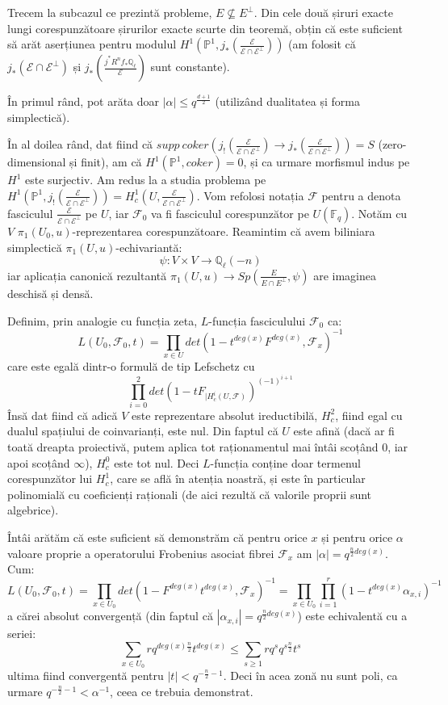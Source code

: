 \documentclass[13pt,openany]{book}
\begin{document}
Trecem la subcazul ce prezintă probleme, $E \nsubseteq E^\perp$. Din cele două șiruri exacte lungi corespunzătoare șirurilor exacte scurte din teoremă, obțin că este suficient să arăt aserțiunea pentru modulul $H^1(\mathbb{P}^1,j_*(\frac{\mathcal{E}}{\mathcal{E} \cap \mathcal{E}^\perp}))$ (am folosit că $j_*(\mathcal{E} \cap \mathcal{E}^\perp)$ și $j_*(\frac{j^* R^n f_* \mathbb{Q}_\ell}{\mathcal{E}})$ sunt constante).

În primul rând, pot arăta doar $|\alpha|\leq q^{\frac{d+1}{2}}$ (utilizând dualitatea și forma simplectică).

În al doilea rând, dat fiind că $supp\ coker(j_!(\frac{\mathcal{E}}{\mathcal{E} \cap \mathcal{E}^\perp}) \rightarrow j_*(\frac{\mathcal{E}}{\mathcal{E} \cap \mathcal{E}^\perp})) = S$ (zero-dimensional și finit), am că $H^1(\mathbb{P}^1,coker)=0$, și ca urmare morfismul indus pe $H^1$ este surjectiv. Am redus la a studia problema pe $H^1(\mathbb{P}^1,j_!(\frac{\mathcal{E}}{\mathcal{E} \cap \mathcal{E}^\perp})) = H^1_c (U, \frac{\mathcal{E}}{\mathcal{E} \cap \mathcal{E}^\perp})$. Vom refolosi notația $\mathcal{F}$ pentru a denota fasciculul $\frac{\mathcal{E}}{\mathcal{E} \cap \mathcal{E}^\perp}$ pe $U$, iar $\mathcal{F}_0$ va fi fasciculul corespunzător pe $U(\mathbb{F}_q)$. Notăm cu $V$ $\pi_1(U_0,u)$-reprezentarea corespunzătoare. Reamintim că avem biliniara simplectică $\pi_1(U,u)$-echivariantă:
$$\psi : V \times V \rightarrow \mathbb{Q}_\ell(-n)$$
iar aplicația canonică rezultantă $\pi_1(U,u) \rightarrow Sp(\frac{E}{E \cap E^\perp},\psi)$ are imaginea deschisă și densă.

Definim, prin analogie cu funcția zeta, $L$-funcția fasciculului $\mathcal{F}_0$ ca:
$$L(U_0,\mathcal{F}_0,t)=\prod\limits_{x \in U} det(1-t^{deg(x)}F^{deg(x)}, \mathcal{F}_x)^{-1}$$
care este egală dintr-o formulă de tip Lefschetz cu
$$\prod\limits_{i=0}^2 det(1-tF_{\mid H^i_c(U,\mathcal{F})})^{(-1)^{i+1}}$$
Însă dat fiind că adică $V$ este reprezentare absolut ireductibilă, $H^2_c$, fiind egal cu dualul spațiului de coinvarianți, este nul. Din faptul că $U$ este afină (dacă ar fi toată dreapta proiectivă, putem aplica tot raționamentul mai întâi scoțând $0$, iar apoi scoțând $\infty$), $H^0_c$ este tot nul. Deci $L$-funcția conține doar termenul corespunzător lui $H^1_c$, care se află în atenția noastră, și este în particular polinomială cu coeficienți raționali (de aici rezultă că valorile proprii sunt algebrice).

Întâi arătăm că este suficient să demonstrăm că pentru orice $x$ și pentru orice $\alpha$ valoare proprie a operatorului Frobenius asociat fibrei $\mathcal{F}_x$ am $|\alpha|=q^{\frac{n}{2} deg(x)}$. Cum:
$$L(U_0,\mathcal{F_0},t)=\prod\limits_{x\in U_0} det(1-F^{deg(x)}t^{deg(x)},\mathcal{F}_x)^{-1} = \prod\limits_{x\in U_0} \prod\limits_{i=1}^r (1-t^{deg(x)}\alpha_{x,i})^{-1}$$
a cărei absolut convergență (din faptul că $|\alpha_{x,i}|=q^{\frac{n}{2} deg(x)}$) este echivalentă cu a seriei:
$$\sum\limits_{x\in U_0} rq^{deg(x)\frac{n}{2}}t^{deg(x)} \leq \sum\limits_{s\geq 1} rq^s q^{s\frac{n}{2}} t^s$$
ultima fiind convergentă pentru $|t|<q^{-\frac{n}{2}-1}$.
Deci în acea zonă nu sunt poli, ca urmare $q^{-\frac{n}{2}-1}<\alpha^{-1}$, ceea ce trebuia demonstrat.
\end{document}
